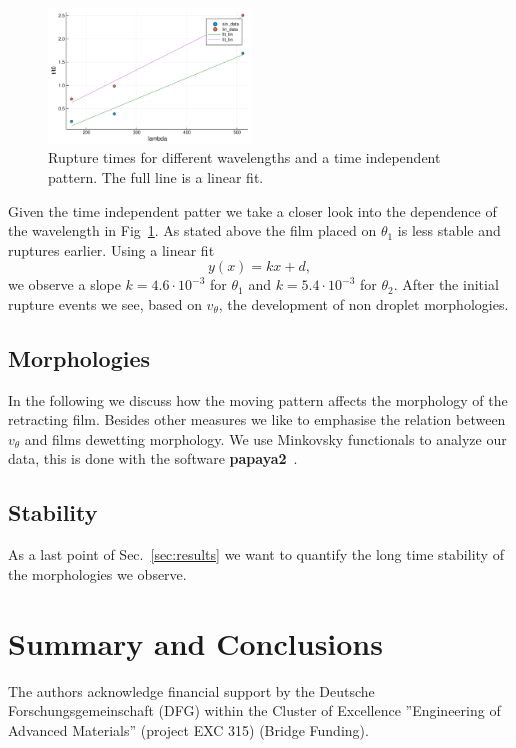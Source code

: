 \documentclass[twocolumn,amsmath,amssymb,showpacs,pre,nofootinbib,superscriptaddress]{revtex4-1} %
\begin{document}
\begin{figure}
    \centering
    \includegraphics[width = 0.48\textwidth]{Figures/fit_rt.pdf}
    \caption{Rupture times for different wavelengths and a time independent pattern.
    The full line is a linear fit.}
    \label{fig:fit_rt}
\end{figure}
Given the time independent patter we take a closer look into the dependence of the wavelength in Fig~\ref{fig:fit_rt}.
As stated above the film placed on $\theta_1$ is less stable and ruptures earlier.
Using a linear fit 
\begin{equation}\label{eq:lin_fit}
    y(x) = kx + d,
\end{equation}
we observe a slope $k = 4.6\cdot 10^{-3}$ for $\theta_1$ and $k= 5.4\cdot 10^{-3}$ for $\theta_2$.
After the initial rupture events we see, based on $v_{\theta}$, the development of non droplet morphologies. 

\subsection{Morphologies}\label{subsec:interT}
In the following we discuss how the moving pattern affects the morphology of the retracting film.
Besides other measures we like to emphasise the relation between $v_{\theta}$ and films dewetting morphology.
We use Minkovsky functionals to analyze our data, this is done with the software \textbf{papaya2}~\cite{Schaller2020}. 


\subsection{Stability}\label{subsec:lateT}
As a last point of Sec.~\ref{sec:results} we want to quantify the long time stability of the morphologies we observe.

\section{Summary and Conclusions}\label{sec:sum_conclu}

\begin{acknowledgements}
The authors acknowledge financial support by the Deutsche Forschungsgemeinschaft (DFG) within the Cluster of Excellence ''Engineering of Advanced Materials'' (project EXC 315) (Bridge Funding). 
\end{acknowledgements}



\end{document}
